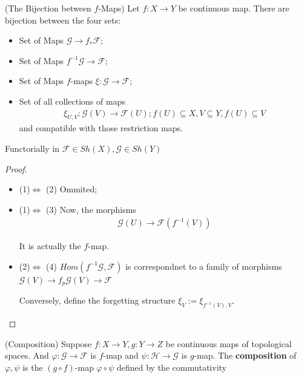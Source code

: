 \documentclass[Total.tex]{subfiles}
\begin{document}
					\begin{lemma}
						(The Bijection between $f$-Maps)\label{Sheaves-Sheaves-Equivalence-of-Morphsims-Induced-by-Continuous-Maps} Let $f:X\rightarrow Y$ be continuous map. There are bijection between the four sets:
						\begin{itemize}
							\item Set of Maps $\mathcal{G}\rightarrow f_*\mathcal{F}$;
							\item Set of Maps $f^{-1}\mathcal{G}\rightarrow \mathcal{F}$;
							\item Set of Maps $f$-maps $\xi:\mathcal{G}\rightarrow \mathcal{F}$;
							\item Set of all collections of maps
							\begin{gather*}
								\xi_{U,V}:\mathcal{G}(V)\rightarrow \mathcal{F}(U);f(U)\subseteq X,V\subseteq Y,f(U)\subseteq V
							\end{gather*}
							and compatible with those restriction maps.
						\end{itemize}
						Functorially in $\mathcal{F}\in Sh(X),\mathcal{G}\in Sh(Y)$ 
					\end{lemma}
					\begin{proof}
						\begin{itemize}
							\item (1)$\Leftrightarrow$ (2) Ommited;
							\item (1)$\Leftrightarrow$ (3) Now, the morphisms
							\begin{gather*}
								\mathcal{G}(U)\rightarrow \mathcal{F}(f^{-1}(V))
							\end{gather*}
							
							It is actually the $f$-map.
							\item (2)$\Leftrightarrow$ (4) $Hom(f^{-1}\mathcal{G},\mathcal{F})$ is correspondnet to a family of morphisms $\mathcal{G}(V)\rightarrow f_p\mathcal{G}(V)\rightarrow \mathcal{F}$ 
							
							Conversely, define the forgetting structure $\xi_V:=\xi_{f^{-1}(V),V}$.
						\end{itemize}
					\end{proof}
					
					\begin{Def}
						(Composition) Suppose $f:X\rightarrow Y,g:Y\rightarrow Z$ be continuous maps of topological spaces. And $\varphi:\mathcal{G}\rightarrow \mathcal{F}$ is $f$-map and $\psi:\mathcal{H}\rightarrow \mathcal{G}$ is $g$-map. The \textbf{composition} of $\varphi,\psi$ is the $(g\circ f)$-map $\varphi\circ\psi$ defined by the commutativity
						\begin{center}
						\end{center}
					\end{Def}
					
\end{document}
